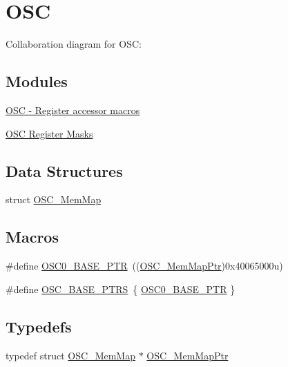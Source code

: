 \hypertarget{group___o_s_c___peripheral}{}\section{O\+SC}
\label{group___o_s_c___peripheral}
Collaboration diagram for O\+SC\+:
\subsection*{Modules}
\begin{DoxyCompactItemize}
\item 
\hyperlink{group___o_s_c___register___accessor___macros}{O\+S\+C -\/ Register accessor macros}
\item 
\hyperlink{group___o_s_c___register___masks}{O\+S\+C Register Masks}
\end{DoxyCompactItemize}
\subsection*{Data Structures}
\begin{DoxyCompactItemize}
\item 
struct \hyperlink{struct_o_s_c___mem_map}{O\+S\+C\+\_\+\+Mem\+Map}
\end{DoxyCompactItemize}
\subsection*{Macros}
\begin{DoxyCompactItemize}
\item 
\#define \hyperlink{group___o_s_c___peripheral_gaab1618c69a91b2e5d3385139b5b566f0}{O\+S\+C0\+\_\+\+B\+A\+S\+E\+\_\+\+P\+TR}~((\hyperlink{group___o_s_c___peripheral_gaaa685163f549fdf24c28ec9b400310b5}{O\+S\+C\+\_\+\+Mem\+Map\+Ptr})0x40065000u)
\item 
\#define \hyperlink{group___o_s_c___peripheral_ga46f69fcb9d660e18b5cbf51adbbcec78}{O\+S\+C\+\_\+\+B\+A\+S\+E\+\_\+\+P\+T\+RS}~\{ \hyperlink{group___o_s_c___peripheral_gaab1618c69a91b2e5d3385139b5b566f0}{O\+S\+C0\+\_\+\+B\+A\+S\+E\+\_\+\+P\+TR} \}
\end{DoxyCompactItemize}
\subsection*{Typedefs}
\begin{DoxyCompactItemize}
\item 
typedef struct \hyperlink{struct_o_s_c___mem_map}{O\+S\+C\+\_\+\+Mem\+Map} $\ast$ \hyperlink{group___o_s_c___peripheral_gaaa685163f549fdf24c28ec9b400310b5}{O\+S\+C\+\_\+\+Mem\+Map\+Ptr}
\end{DoxyCompactItemize}


